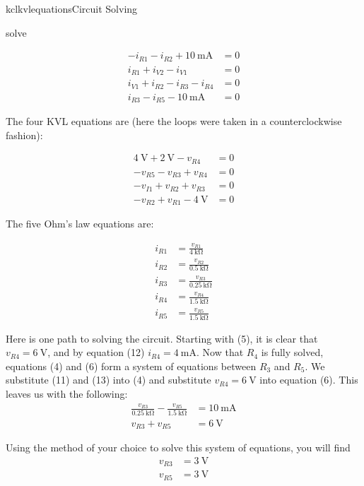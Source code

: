 \begin{mainquestion}{kclkvlequations}{Circuit Solving}
\begin{partquestion}{solve}
\begin{answer}
\begin{align}
-i_{R1}-i_{R2}+\qty{10}{\milli\ampere} &= 0 \\
i_{R1}+i_{V2}-i_{V1} &= 0 \\
i_{V1}+i_{R2}-i_{R3}-i_{R4} &= 0 \\
i_{R3}-i_{R5}-\qty{10}{\milli\ampere} &= 0
\end{align}

The four KVL equations are (here the loops were taken in a counterclockwise fashion):

\begin{align}
\qty{4}{\volt}+\qty{2}{\volt}-v_{R4} &= 0 \\
-v_{R5}-v_{R3}+v_{R4} &= 0 \\
-v_{I1}+v_{R2}+v_{R3} &= 0 \\
-v_{R2}+v_{R1}-\qty{4}{\volt} &= 0
\end{align}

The five Ohm's law equations are:

\begin{align}
i_{R1} &= \frac{v_{R1}}{\qty{4}{\kilo\ohm}} \\
i_{R2} &= \frac{v_{R2}}{\qty{0.5}{\kilo\ohm}} \\
i_{R3} &= \frac{v_{R3}}{\qty{0.25}{\kilo\ohm}} \\
i_{R4} &= \frac{v_{R4}}{\qty{1.5}{\kilo\ohm}} \\
i_{R5} &= \frac{v_{R5}}{\qty{1.5}{\kilo\ohm}}
\end{align}

Here is one path to solving the circuit. Starting with (5), it is clear that
$v_{R4}=\qty{6}{\volt}$, and by equation (12)
$i_{R4}=\qty{4}{\milli\ampere}$. Now that $R_4$ is fully solved, equations (4) and (6) form a system of equations between $R_3$ and $R_5$. We substitute (11) and (13) into (4) and substitute $v_{R4}=\qty{6}{\volt}$ into equation (6). This leaves us with the following:
\begin{align*}
\frac{v_{R3}}{\qty{0.25}{\kilo\ohm}}
-
\frac{v_{R5}}{\qty{1.5}{\kilo\ohm}}
&=
\qty{10}{\milli\ampere} \\
v_{R3}+v_{R5}
&=
\qty{6}{\volt}
\end{align*}

Using the method of your choice to solve this system of equations, you will find
\begin{align*}
v_{R3} &= \qty{3}{\volt} \\
v_{R5} &= \qty{3}{\volt}
\end{align*}


\end{answer}
\end{partquestion}
\end{mainquestion}
